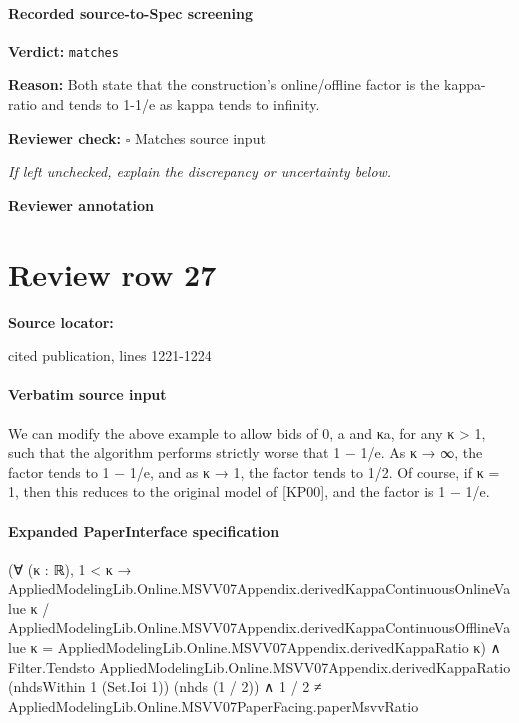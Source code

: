 \documentclass[10pt]{article}
\newcommand{\reviewerbox}{%
  \par\noindent\fbox{\parbox{0.96\linewidth}{\rule{0pt}{0.38in}}}\par
}
\newcommand{\reviewmatch}[1]{%
  \par\noindent\textbf{Reviewer check:} $\square$\; #1\par
  \noindent\emph{If left unchecked, explain the discrepancy or uncertainty below.}\par
}
\begin{document}
\paragraph{Recorded source-to-Spec screening}
\textbf{Verdict:} \texttt{matches}
\\
{\raggedright
\textbf{Reason:} Both state that the construction's online/\allowbreak{}offline factor is the kappa-\allowbreak{}ratio and tends to 1-\allowbreak{}1/\allowbreak{}e as kappa tends to infinity.\allowbreak{}
\par}
\reviewmatch{Matches source input}
\noindent\textbf{Reviewer annotation}\par
\reviewerbox
\clearpage
\hypertarget{source-claim-1a2fb8b225b86ff5}{}
\section*{Review row 27}
\textbf{Source locator:} {\footnotesize\raggedright cited publication, lines 1221-\allowbreak{}1224\par}
\paragraph{Verbatim source input}
\begin{ReviewVerbatim}
We can modify the above example to allow bids of 0, a and κa, for any κ > 1, such that the
algorithm performs strictly worse that 1 − 1/e.
As κ → ∞, the factor tends to 1 − 1/e, and as κ → 1, the factor tends to 1/2. Of course, if
κ = 1, then this reduces to the original model of [KP00], and the factor is 1 − 1/e.
\end{ReviewVerbatim}



\paragraph{Expanded PaperInterface specification}
\begin{ReviewVerbatim}
(∀ (κ : ℝ),
    1 < κ →
      AppliedModelingLib.Online.MSVV07Appendix.derivedKappaContinuousOnlineValue κ /
          AppliedModelingLib.Online.MSVV07Appendix.derivedKappaContinuousOfflineValue κ =
        AppliedModelingLib.Online.MSVV07Appendix.derivedKappaRatio κ) ∧
  Filter.Tendsto AppliedModelingLib.Online.MSVV07Appendix.derivedKappaRatio (nhdsWithin 1 (Set.Ioi 1)) (nhds (1 / 2)) ∧
    1 / 2 ≠ AppliedModelingLib.Online.MSVV07PaperFacing.paperMsvvRatio
\end{ReviewVerbatim}
\end{document}
